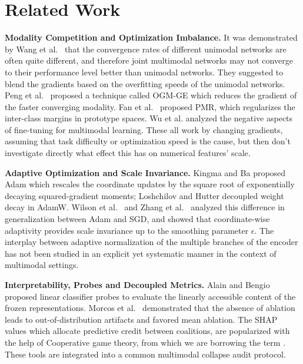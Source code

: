 \documentclass[conference]{IEEEtran}
\begin{document}
\section{Related Work}
\textbf{Modality Competition and Optimization Imbalance.}
It was demonstrated by Wang et al.\ \cite{wang2020makes} that the convergence rates of different unimodal networks are often quite different, and therefore joint multimodal networks may not converge to their performance level better than unimodal networks. They suggested to blend the gradients based on the overfitting speeds of the unimodal networks. Peng et al.\ \cite{peng2022balanced} proposed a technique called OGM-GE which reduces the gradient of the faster converging modality. Fan et al.\ \cite{fan2023pmr} proposed PMR, which regularizes the inter-class margins in prototype spaces. Wu et al. \cite{wu2022characterizing} analyzed the negative aspects of fine-tuning for multimodal learning. These all work by changing gradients, assuming that task difficulty or optimization speed is the cause, but then don't investigate directly what effect this has on numerical features' scale.

\textbf{Adaptive Optimization and Scale Invariance.}
Kingma and Ba \cite{kingma2015adam} proposed Adam which rescales the coordinate updates by the square root of exponentially decaying squared-gradient moments; Loshchilov and Hutter \cite{loshchilov2019decoupled} decoupled weight decay in AdamW. Wilson et al.\ \cite{wilson2017marginal} and Zhang et al.\ \cite{zhang2020adaptive} analyzed this difference in generalization between Adam and SGD, and showed that coordinate-wise adaptivity provides scale invariance up to the smoothing parameter $\epsilon$. The interplay between adaptive normalization of the multiple branches of the encoder has not been studied in an explicit yet systematic manner in the context of multimodal settings.

\textbf{Interpretability, Probes and Decoupled Metrics.}
Alain and Bengio \cite{alain2016understanding} proposed linear classifier probes to evaluate the linearly accessible content of the frozen representations. Morcos et al.\ \cite{morcos2018importance} demonstrated that the absence of ablation leads to out-of-distribution artifacts and favored mean ablation. The SHAP values \cite{lundberg2017unified} which allocate predictive credit between coalitions, are popularized with the help of Cooperative game theory, from which we are borrowing the term \cite{shapley1953value}.%
 These tools are integrated into a common multimodal collapse audit protocol.
\end{document}
